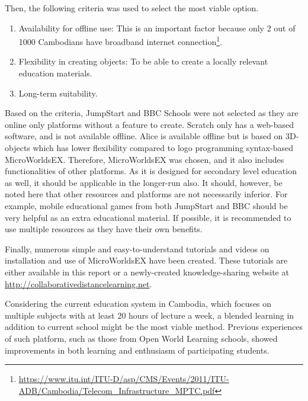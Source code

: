 \newpage
Then, the following criteria was used to select the most viable option.

\begin{enumerate}
	\item Availability for offline use: This is an important factor because only 2 out of 1000 Cambodians have broadband internet connection\footnote{\url{https://www.itu.int/ITU-D/asp/CMS/Events/2011/ITU-ADB/Cambodia/Telecom_Infrastructure_MPTC.pdf}}.
	\item Flexibility in creating objects: To be able to create a locally relevant education materials.
	
	\item Long-term suitability.
	
\end{enumerate}

Based on the criteria, JumpStart and BBC Schools were not selected as they are online only platforms without a feature to create. Scratch only has a web-based software, and is not available offline. Alice is available offline but is based on 3D-objects which has lower flexibility compared to logo programming syntax-based MicroWorldsEX. Therefore, MicroWorldsEX was chosen, and it also includes functionalities of other platforms. As it is designed for secondary level education as well, it should be applicable in the longer-run also. It should, however, be noted here that other resources and platforms are not necessarily inferior. For example, mobile educational games from both JumpStart and BBC should be very helpful as an extra educational material. If possible, it is recommended to use multiple resources as they have their own benefits.


Finally, numerous simple and easy-to-understand tutorials and videos on installation and use of MicroWorldsEX have been created. These tutorials are either available in this report or a newly-created knowledge-sharing website at {\small \url{http://collaborativedistancelearning.net}}.


Considering the current education system in Cambodia, which focuses on multiple subjects with at least 20 hours of lecture a week, a blended learning in addition to current school might be the most viable method. Previous experiences of such platform, such as those from Open World Learning schools, showed improvements in both learning and enthusiasm of participating students.


